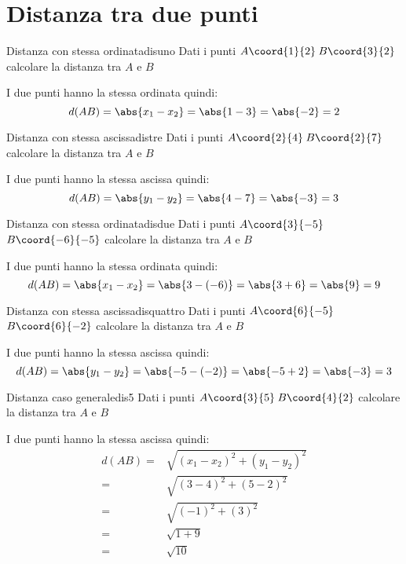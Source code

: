 \chapter{Distanza tra due punti}
\label{cha:DistanzaTraduePunti}
\begin{esempiot}{Distanza con stessa ordinata}{disuno}
Dati i punti $A\coord{1}{2}$\,$B\coord{3}{2}$ calcolare la distanza tra $A$ e $B$
\end{esempiot}
I due punti hanno la stessa ordinata quindi:
\begin{equation*}
d(AB)=\abs{x_1-x_2}=\abs{1-3}=\abs{-2}=2
\end{equation*}
\begin{esempiot}{Distanza con stessa ascissa}{distre}
	Dati i punti $A\coord{2}{4}$\,$B\coord{2}{7}$ calcolare la distanza tra $A$ e $B$
\end{esempiot}
I due punti hanno la stessa ascissa quindi: 
\begin{equation*}
	d(AB)=\abs{y_1-y_2}=\abs{4-7}=\abs{-3}=3
\end{equation*}
\begin{esempiot}{Distanza con stessa ordinata}{disdue}
	Dati i punti $A\coord{3}{-5}$\,$B\coord{-6}{-5}$ calcolare la distanza tra $A$ e $B$
\end{esempiot}
I due punti hanno la stessa ordinata quindi: 
\begin{equation*}
d(AB)=\abs{x_1-x_2}=\abs{3-(-6)}=\abs{3+6}=\abs{9}=9
\end{equation*}

\begin{esempiot}{Distanza con stessa ascissa}{disquattro}
	Dati i punti $A\coord{6}{-5}$\,$B\coord{6}{-2}$ calcolare la distanza tra $A$ e $B$
\end{esempiot}
I due punti hanno la stessa ascissa quindi: 
\begin{equation*}
d(AB)=\abs{y_1-y_2}=\abs{-5-(-2)}=\abs{-5+2}=\abs{-3}=3
\end{equation*}
\begin{esempiot}{Distanza caso generale}{dis5}
	Dati i punti $A\coord{3}{5}$\,$B\coord{4}{2}$ calcolare la distanza tra $A$ e $B$
\end{esempiot}
I due punti hanno la stessa ascissa quindi: 
\begin{align*}
	d(AB)=&\sqrt{(x_1-x_2)^2+(y_1-y_2)^2}\\
	=&\sqrt{(3-4)^2+(5-2)^2}\\
=&\sqrt{(-1)^2+(3)^2}\\
=&\sqrt{1+9}\\
=&\sqrt{10}
\end{align*}

